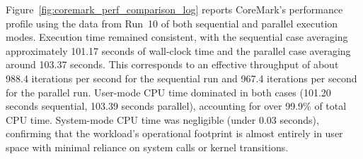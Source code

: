 Figure~\ref{fig:coremark_perf_comparison_log} reports CoreMark's performance profile using the data from Run~10 of both sequential and parallel execution modes. Execution time remained consistent, with the sequential case averaging approximately 101.17 seconds of wall-clock time and the parallel case averaging around 103.37 seconds. This corresponds to an effective throughput of about 988.4 iterations per second for the sequential run and 967.4 iterations per second for the parallel run. User-mode CPU time dominated in both cases (101.20 seconds sequential, 103.39 seconds parallel), accounting for over 99.9\% of total CPU time. System-mode CPU time was negligible (under 0.03 seconds), confirming that the workload’s operational footprint is almost entirely in user space with minimal reliance on system calls or kernel transitions.

